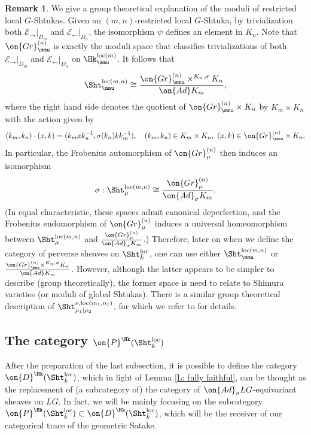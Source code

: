 \documentclass[11pt]{amsart}
\theoremstyle{definition}
\newtheorem{remark}[thm]{Remark}
\theoremstyle{definition}
\theoremstyle{definition}
\numberwithin{equation}{subsection}
\def\calE{\mathcal{E}}
\newcommand{\Ad}{{\on{Ad}}}
\newcommand{\Gr}{{\on{Gr}}}
\newcommand{\loc}{\mathrm{loc}}
\newcommand{\leftone}{\leftarrow}
\newcommand{\rightone}{\to}
\begin{document}
\begin{remark}
\label{R: grp theoretical Sht}
We give a group theoretical explanation of the moduli of restricted local $G$-Shtukas.
Given an $(m,n)$-restricted local $G$-Shtuka, by trivialization both $\calE_\rightone|_{D_{m}}$ and $\calE_\leftone|_{D_{n}}$, the isomorphism $\psi$ defines an element in $K_n$.
Note that $\Gr_\mmu^{(n)}$ is exactly the moduli space that classifies trivializations of both $\calE_\rightone|_{D_{m}}$ and $\calE_\leftone|_{D_{n}}$ on $\Hk^{\loc(m)}_\mmu$. It follows that
\[
\Sht_{\mmu}^{\loc(m,n)}\cong \frac{\Gr^{(n)}_{\mmu}\times^{K_n,\sigma} K_n}{\Ad K_m},
\]
where the right hand side denotes the quotient of $\Gr_{\mmu}^{(n)}\times K_n$ by $K_m\times K_n$ with the action given by 
$$(k_m,k_n)\cdot (x,k)=(k_mxk_n^{-1},\sigma(k_n)kk_m^{-1}), \quad (k_m,k_n)\in K_m\times K_n, \ (x,k)\in \Gr_\mmu^{(n)}\times K_n.$$
In particular, the Frobenius automorphism of $\Gr_{\mu}^{(n)}$ then induces an isomorphism
\[\sigma: \Sht_\mu^{\loc(m,n)}\cong \frac{\Gr_{\mu}^{(n)}}{\Ad_\sigma K_m}.\]
(In equal characteristic, these spaces admit canonical deperfection, and  the Frobenius endomorphism of $\Gr_{\mu}^{(n)}$ induces a universal homeomorphism between $\Sht_\mu^{\loc(m,n)}$ and $\frac{\Gr_{\mu}^{(n)}}{\Ad_\sigma K_m}$.)
Therefore, later on when we define the category of perverse sheaves on $\Sht^\loc_{\bar k}$, one can use either $\Sht_{\mmu}^{\loc(m,n)}$ or $\frac{\Gr^{(n)}_{\mmu}\times^{K_n,\sigma} K_n}{\Ad K_m}$. However, although the latter appears to be simpler to describe (group theoretically), the former space is need to relate to Shimura varieties (or moduli of global Shtukas). There is a similar group theoretical description of $\Sht_{\mu_1\mid \mu_2}^{\nu,\loc(m_1,n_1)}$, for which we refer to \cite[Remark 5.3.15]{XZ} for details.
\end{remark}


\subsection{The category $\on{P}^\Hk(\Sht^\loc_{\bar k})$}
After the preparation of the last subsection, it is possible to define the category $\on{D}^\Hk(\Sht^\loc_{\bar k})$, which in light of Lemma \ref{L: fully faithful}, can be thought as the replacement of (a subcategory of) the category of $\Ad_\sigma LG$-equivariant sheaves on $LG$. In fact, we will be mainly focusing on the subcategory $\on{P}^{\Hk}(\Sht^\loc_{\bar k})\subset \on{D}^\Hk(\Sht^\loc_{\bar k})$, which will be the receiver of our categorical trace of the geometric Satake.
\end{document}
